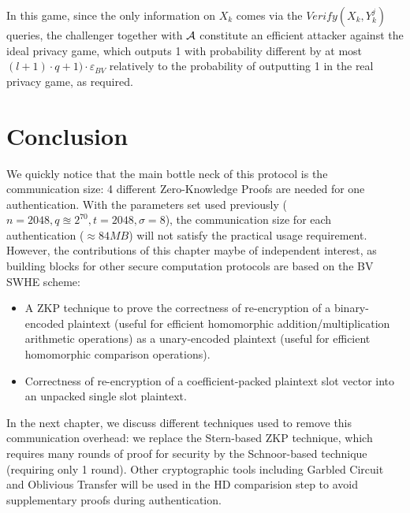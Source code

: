 In this game, since the only information on $X_k$ comes via the $Verify(X_k,Y_k^{j})$ queries, the challenger together with $\mathcal{A}$ constitute an efficient attacker against the ideal privacy game, which outputs 1 with probability different by at most $(l+1) \cdot q + 1) \cdot \varepsilon_{BV}$ relatively to the probability of outputting 1 in the real privacy game, as required.

\section{Conclusion}
\label{sec:evaluation}
We quickly notice that the main bottle neck of this protocol is the
communication size: 4 different Zero-Knowledge Proofs are needed for one
authentication. With the parameters set used previously
($n=2048, q \approxeq 2^{70}, t = 2048, \sigma=8$), the communication size for
each authentication ($\approx 84MB$) will not satisfy the practical usage
requirement. However, the contributions of this chapter maybe of independent
interest, as building blocks for other secure computation protocols are based on the
BV SWHE scheme:
\begin{itemize}
\item A ZKP technique to prove the correctness of re-encryption of a
  binary-encoded plaintext (useful for efficient homomorphic
  addition/multiplication arithmetic operations) as a unary-encoded plaintext
  (useful for efficient homomorphic comparison operations).
\item Correctness of re-encryption of a coefficient-packed plaintext slot vector
  into an unpacked single slot plaintext.
\end{itemize}
In the next chapter, we discuss different techniques used to remove this
communication overhead: we replace the Stern-based ZKP technique, which requires
many rounds of proof for security by the Schnoor-based technique (requiring only 1 round). Other cryptographic tools including Garbled Circuit and Oblivious
Transfer will be used in the HD comparision step to avoid supplementary proofs during
authentication.




